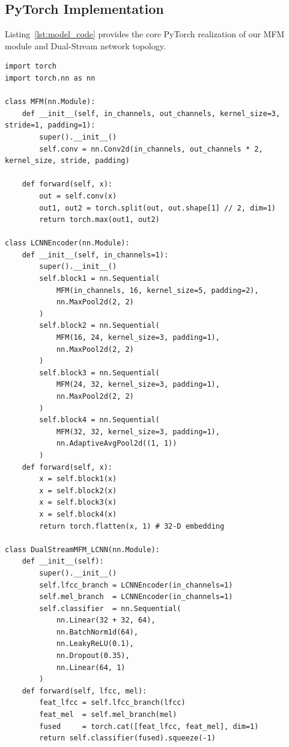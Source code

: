 \documentclass[runningheads]{llncs}
\begin{document}
\subsection{PyTorch Implementation}
Listing~\ref{lst:model_code} provides the core PyTorch realization of our MFM module and Dual-Stream network topology.

\begin{lstlisting}[caption={PyTorch implementation of the MFM activation and Dual-Stream LCNN.}, label={lst:model_code}]
import torch
import torch.nn as nn

class MFM(nn.Module):
    def __init__(self, in_channels, out_channels, kernel_size=3, stride=1, padding=1):
        super().__init__()
        self.conv = nn.Conv2d(in_channels, out_channels * 2, kernel_size, stride, padding)

    def forward(self, x):
        out = self.conv(x)
        out1, out2 = torch.split(out, out.shape[1] // 2, dim=1)
        return torch.max(out1, out2)

class LCNNEncoder(nn.Module):
    def __init__(self, in_channels=1):
        super().__init__()
        self.block1 = nn.Sequential(
            MFM(in_channels, 16, kernel_size=5, padding=2),
            nn.MaxPool2d(2, 2)
        )
        self.block2 = nn.Sequential(
            MFM(16, 24, kernel_size=3, padding=1),
            nn.MaxPool2d(2, 2)
        )
        self.block3 = nn.Sequential(
            MFM(24, 32, kernel_size=3, padding=1),
            nn.MaxPool2d(2, 2)
        )
        self.block4 = nn.Sequential(
            MFM(32, 32, kernel_size=3, padding=1),
            nn.AdaptiveAvgPool2d((1, 1))
        )
    def forward(self, x):
        x = self.block1(x)
        x = self.block2(x)
        x = self.block3(x)
        x = self.block4(x)
        return torch.flatten(x, 1) # 32-D embedding

class DualStreamMFM_LCNN(nn.Module):
    def __init__(self):
        super().__init__()
        self.lfcc_branch = LCNNEncoder(in_channels=1)
        self.mel_branch  = LCNNEncoder(in_channels=1)
        self.classifier  = nn.Sequential(
            nn.Linear(32 + 32, 64),
            nn.BatchNorm1d(64),
            nn.LeakyReLU(0.1),
            nn.Dropout(0.35),
            nn.Linear(64, 1)
        )
    def forward(self, lfcc, mel):
        feat_lfcc = self.lfcc_branch(lfcc)
        feat_mel  = self.mel_branch(mel)
        fused     = torch.cat([feat_lfcc, feat_mel], dim=1)
        return self.classifier(fused).squeeze(-1)
\end{lstlisting}
\end{document}
